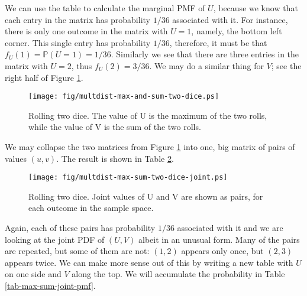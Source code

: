 We can use the table to calculate the marginal PMF of \(U\), because
we know that each entry in
the matrix has probability \(1/36\) associated with it. For instance,
there is only one outcome in the matrix with \(U=1\), namely, the
bottom left corner. This single entry has probability \(1/36\),
therefore, it must be that
\(f_{U}(1)=\mathbb{P}(U=1)=1/36\). Similarly we see that there are
three entries in the matrix with \(U=2\), thus
\(f_{U}(2)=3/36\).
We may do a similar thing for \(V\); see the right half of Figure
\ref{fig-max-and-sum-two-dice}.

\begin{figure}[ht!]
\centering
\texttt{[image: fig/multdist-max-and-sum-two-dice.ps]}
\caption[Max and Sum of two dice]{\label{fig-max-and-sum-two-dice}\small Rolling two dice. The value of U is the maximum of the two rolls, while the value of V is the sum of the two rolls.}
\end{figure}

We may collapse the two matrices from Figure \ref{fig-max-and-sum-two-dice} into
one, big matrix of pairs of values \((u,v)\). The result is shown in
Table \ref{fig-max-sum-two-dice-joint}.

\begin{figure}[ht!]
\centering
\texttt{[image: fig/multdist-max-sum-two-dice-joint.ps]}
\caption[Joint outcomes of Max and Sum]{\label{fig-max-sum-two-dice-joint}\small Rolling two dice. Joint values of U and V are shown as pairs, for each outcome in the sample space.}
\end{figure}

Again, each of these pairs has probability \(1/36\) associated with it
and we are looking at the joint PDF of \((U,V)\) albeit in an unusual
form. Many of the pairs are repeated, but some of them are not:
\((1,2)\) appears only once, but \((2,3)\) appears twice. We can make
more sense out of this by writing a new table with \(U\) on one side
and \(V\) along the top.
We will accumulate the probability in Table \ref{tab-max-sum-joint-pmf}.


